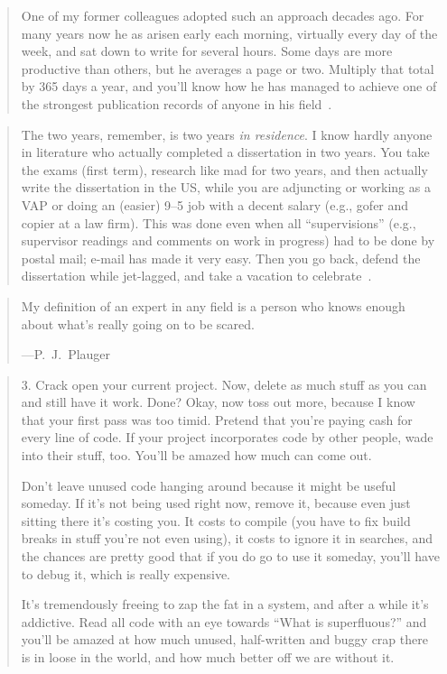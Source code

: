 \documentclass[a4paper]{article}
\begin{document}
\medskip
\begin{quote}
	One of my former colleagues adopted such an approach decades
	ago.  For many years now he as arisen early each morning,
	virtually every day of the week, and sat down to write for
	several hours.  Some days are more productive than others,
	but he averages a page or two.  Multiply that total by 365
	days a year, and you'll know how he has managed to achieve
	one of the strongest publication records of anyone in his
	field~\citep[p.~72]{Cahn2008}.
\end{quote}

\medskip
\begin{quote}
	The two years, remember, is two years \emph{in residence}. I
	know hardly
	anyone in literature who actually completed a dissertation in
	two years. You take the exams (first term), research like mad
	for two years, and then actually write the dissertation in the
	US, while you are adjuncting or working as a VAP or doing an
	(easier) 9--5 job with a decent salary (e.g., gofer and copier at
	a law firm). This was done even when all ``supervisions'' (e.g.,
	supervisor readings and comments on work in progress) had to
	be done by postal mail; e-mail has made it very easy. Then you
	go back, defend the dissertation while jet-lagged, and take a
	vacation to celebrate~\citep{seniorscholar2008}.
\end{quote}

\medskip
\begin{quote}
	My definition of an expert in any field is a person who knows
	enough about what's really going on to be scared.

	---P.~J.~Plauger~\citeyearpar{Plaugher1983}
\end{quote}

\medskip
\begin{quote}
	3. Crack open your current project. Now, delete as much stuff as
	you can and still have it work. Done? Okay, now toss out more,
	because I know that your first pass was too timid. Pretend
	that you're paying cash for every line of code. If your project
	incorporates code by other people, wade into their stuff,
	too. You'll be amazed how much can come out.

	Don't leave unused code hanging around because it might be useful
	someday. If it's not being used right now, remove it, because
	even just sitting there it's costing you. It costs to compile
	(you have to fix build breaks in stuff you're not even using),
	it costs to ignore it in searches, and the chances are pretty
	good that if you do go to use it someday, you'll have to debug it,
	which is really expensive.

	It's tremendously freeing to zap the fat in a system, and
	after a while it's addictive. Read all code with an eye towards
	``What is superfluous?'' and you'll be amazed at how much unused,
	half-written and buggy crap there is in loose in the world,
	and how much better off we are without it.~\citep{Dyer2009}
\end{quote}
\end{document}
